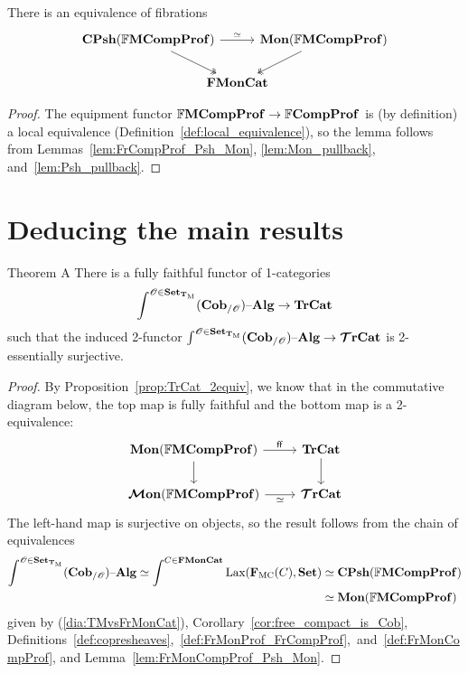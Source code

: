 \documentclass[12pt,oneside,article,draft]{memoir}
\begin{document}
\begin{lemma}\label{lem:FrMonCompProf_Psh_Mon}
   There is an equivalence of fibrations
   \begin{equation*}
      \begin{tikzcd}[column sep=-1.5em]
         \CPsh(\dFrMonCompProf) \ar[rr,"\equiv"] \ar[dr,two heads]
            && \Mon(\dFrMonCompProf) \ar[dl,two heads] \\
            & \FrMonCat &
      \end{tikzcd}
   \end{equation*}
\end{lemma}
\begin{proof}
   The equipment functor $\mathbb{F}\mathbf{MCompProf}\to\mathbb{F}\mathbf{CompProf}$ is (by definition) a local equivalence
   (Definition~\ref{def:local_equivalence}), so the lemma follows from
   Lemmas~\ref{lem:FrCompProf_Psh_Mon}, \ref{lem:Mon_pullback}, and~\ref{lem:Psh_pullback}.
\end{proof}

\section{Deducing the main results}\label{sec:deducing}

\begin{named}{Theorem A}
  There is a fully faithful functor of 1-categories
   \begin{equation*}
      \int^{\mathscr{O}\in\mathbf{Set}_{\mathbf{T}_{\textrm{M}}}}(\mathbf{Cob}_{/\mathscr{O}}){\text \textendash}\mathbf{Alg} \to \mathbf{TrCat}
   \end{equation*}
   such that the induced 2-functor $\int^{\mathscr{O}\in\mathbf{Set}_{\mathbf{T}_{\textrm{M}}}}(\mathbf{Cob}_{/\mathscr{O}}){\text \textendash}\mathbf{Alg}\to\bm{\mathcal{T}}\mathbf{rCat}$ is 2-essentially surjective.
\end{named}

\begin{proof}

By Proposition~\ref{prop:TrCat_2equiv}, we know that in the commutative diagram below, the top map is fully faithful and the bottom map is a 2-equivalence:
\begin{equation*}
	\begin{tikzcd}
		\Mon(\dFrMonCompProf)\ar[r,"\ff"]\ar[d]&\TrCat\ar[d]\\
		\MMon(\dFrMonCompProf)\ar[r,"\equiv"']&\TTrCat
	\end{tikzcd}
\end{equation*}
The left-hand map is surjective on objects, so the result follows from the chain of equivalences
\begin{align*}
\int^{\mathscr{O}\in\mathbf{Set}_{\mathbf{T}_{\textrm{M}}}}(\mathbf{Cob}_{/\mathscr{O}}){\text \textendash}\mathbf{Alg}\simeq\int^{C\in\mathbf{FMonCat}}\operatorname{Lax}(\mathbf{F}_{\textrm{MC}}(C),\mathbf{Set})
&\simeq\mathbf{CPsh}(\mathbb{F}\mathbf{MCompProf})\\
&\simeq\mathbf{Mon}(\mathbb{F}\mathbf{MCompProf})
\end{align*}
given by (\ref{dia:TMvsFrMonCat}), Corollary~\ref{cor:free_compact_is_Cob}, Definitions~\ref{def:copresheaves},~\ref{def:FrMonProf_FrCompProf},~and~\ref{def:FrMonCompProf}, and Lemma~\ref{lem:FrMonCompProf_Psh_Mon}.
\end{proof}
\end{document}
